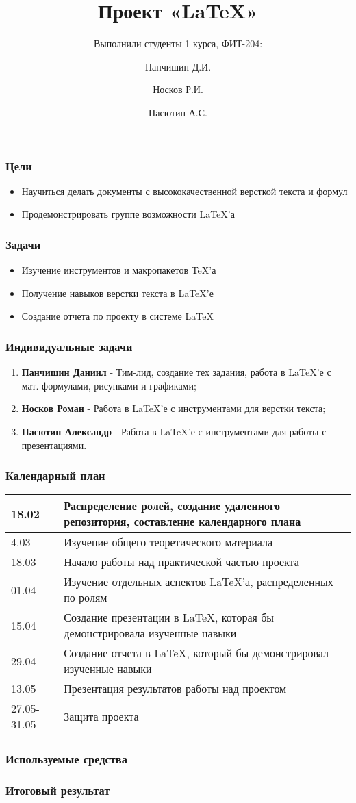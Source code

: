 \documentclass[russian]{beamer}
\author[]{Панчишин Д.И.
\and Носков Р.И.
\and Пасютин А.С.
}
\title[Презентация]{Проект \textbf{«\LaTeX»}}
\subtitle{Выполнили студенты 1 курса, ФИТ-204:}
\date[]{}
\institute[]{}
\begin{document}
	
	\begin{frame}
		\maketitle
	\end{frame}

\begin{frame}
	\frametitle{Цели}
	\begin{itemize}
		\item Научиться делать документы с высококачественной версткой текста и формул
		\item Продемонстрировать группе возможности \LaTeX'а
	\end{itemize}
\end{frame}

\begin{frame}
	\frametitle{Задачи}
	\begin{itemize}
		\item Изучение инструментов и макропакетов \TeX’а
		\item Получение навыков верстки текста в \LaTeX'е
		\item Создание отчета по проекту в системе \LaTeX
	\end{itemize}
\end{frame}

\begin{frame}
	\frametitle{Индивидуальные задачи}
	\begin{enumerate}
		\item<1-> \textbf{Панчишин Даниил} - Тим-лид, создание тех задания, работа в \LaTeX’е с мат. формулами, рисунками и графиками;
		\item<2-> \textbf{Носков Роман} - Работа в \LaTeX’е с инструментами для верстки текста;
		\item<3-> \textbf{Пасютин Александр} - Работа в \LaTeX’е с инструментами для работы с презентациями.
	\end{enumerate}
\end{frame}

\begin{frame}
	\frametitle{Календарный план}
	\begin{tabular}{|l|p{8cm}|}
		\hline
		18.02 & Распределение ролей, создание удаленного репозитория, составление календарного плана \\
		\hline
		4.03 & Изучение общего теоретического материала \\
		\hline
		18.03 & Начало работы над практической частью проекта \\
		\hline
		01.04 & Изучение отдельных аспектов \LaTeX’а, распределенных по ролям \\
		\hline
		15.04 & Создание презентации в \LaTeX, которая бы демонстрировала изученные навыки \\
		\hline
		29.04 & Создание отчета в \LaTeX, который бы демонстрировал изученные навыки
		\\
		\hline
		13.05 & Презентация результатов работы над проектом \\
		\hline
		27.05-31.05 & Защита проекта \\
		\hline
	\end{tabular}
\end{frame}

\begin{frame}
	\frametitle{Используемые средства}
\end{frame}

\begin{frame}
	\frametitle{Итоговый результат}
\end{frame}
\end{document}
